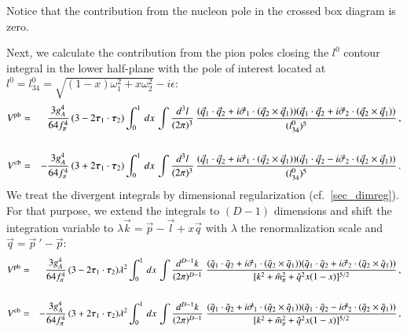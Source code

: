 \documentclass[sort&compress,preprint,3p]{elsarticle}
\begin{document}
Notice that the 
contribution from the nucleon pole in the crossed box diagram is zero.

Next, we calculate the contribution from the pion poles closing the $l^0$ contour
integral in the lower half-plane with the pole of interest located at
$l^0=l^0_{34}=\sqrt{(1-x)\omega_1^2+x\omega_2^2} - i \epsilon$:
%
\begin{eqnarray}
V^{\rm pb} &=& \frac{3g_A^4}{64 f_\pi^4} \,
(3-2 \mbox{\boldmath $\tau$}_1 \cdot \mbox{\boldmath $\tau$}_2) 
\int_0^1\, dx\,\int \frac{d^3 l}{(2\pi)^3} \,
\frac{(\vec q_1 \cdot \vec q_2 + i \vec \sigma_1 \cdot (\vec q_2 \times \vec q_1))
(\vec q_1 \cdot \vec q_2 + i \vec \sigma_2 \cdot (\vec q_2 \times \vec q_1))}
{(l^0_{34})^5} \,, 
\nonumber \\
\\
V^{\rm cb} &=& -\frac{3g_A^4}{64 f_\pi^4} \,
(3+2 \mbox{\boldmath $\tau$}_1 \cdot \mbox{\boldmath $\tau$}_2) 
\int_0^1\, dx\,\int \frac{d^3 l}{(2\pi)^3} \,
\frac{(\vec q_1 \cdot \vec q_2 + i \vec \sigma_1 \cdot (\vec q_2 \times \vec q_1))
(\vec q_1 \cdot \vec q_2 - i \vec \sigma_2 \cdot (\vec q_2 \times \vec q_1))}
{(l^0_{34})^5}  \,.
\nonumber \\
\end{eqnarray}
%
We treat the divergent integrals by dimensional regularization 
(cf.\ \ref{sec_dimreg}).
For that purpose, we extend the integrals to $(D-1)$ dimensions and shift the
integration variable to $\lambda \vec k = \vec p - \vec l + x \vec q$ with $\lambda$
the renormalization scale and $\vec q={\vec p}~' - \vec p$:
%
\begin{eqnarray}
V^{\rm pb} &=& \frac{3g_A^4}{64 f_\pi^4} \,
(3-2 \mbox{\boldmath $\tau$}_1 \cdot \mbox{\boldmath $\tau$}_2) 
\lambda^{2}
\int_0^1\, dx\,\int \frac{d^{D-1} k}{(2\pi)^{D-1}} \;
\frac{(\tilde q_1 \cdot \tilde q_2 + i \vec \sigma_1 \cdot (\tilde q_2 \times \tilde q_1))
(\tilde q_1 \cdot \tilde q_2 + i \vec \sigma_2 \cdot (\tilde q_2 \times \tilde q_1))}
{[k^2+\tilde m_\pi^2+\tilde q^2 x(1-x)]^{5/2}}
\,,
\nonumber \\
\\
V^{\rm cb} &=& -\frac{3g_A^4}{64 f_\pi^4} \,
(3+2 \mbox{\boldmath $\tau$}_1 \cdot \mbox{\boldmath $\tau$}_2) 
\lambda^{2}
\int_0^1\, dx\,\int \frac{d^{D-1} k}{(2\pi)^{D-1}} \;
\frac{(\tilde q_1 \cdot \tilde q_2 + i \vec \sigma_1 \cdot (\tilde q_2 \times \tilde q_1))
(\tilde q_1 \cdot \tilde q_2 - i \vec \sigma_2 \cdot (\tilde q_2 \times \tilde q_1))}
{[k^2+\tilde m_\pi^2+\tilde q^2 x(1-x)]^{5/2}}
\,,
\nonumber \\
\end{eqnarray}
\end{document}
